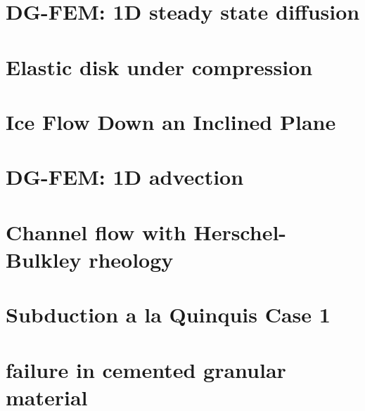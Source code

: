 \documentclass[a4paper,11pt]{report}
\begin{document}
\chapter{DG-FEM: 1D steady state diffusion \label{f57}} %

\chapter{Elastic disk under compression \label{f58}} %

\chapter{Ice Flow Down an Inclined Plane \label{f59}} %

\chapter{DG-FEM: 1D advection \label{f60}} %

\chapter{Channel flow with Herschel-Bulkley rheology \label{f61}} %

\chapter{Subduction a la Quinquis Case 1 \label{f62}} %

\chapter{failure in cemented granular material \label{f63}} %
\end{document}
